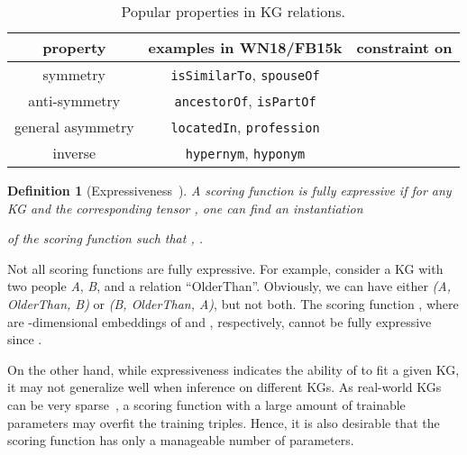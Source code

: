 \documentclass[10pt,journal,compsoc]{IEEEtran}
\newtheorem{definition}{Definition}
\begin{document}
\begin{table}[t]
	\centering
	\caption{Popular properties in KG relations.}
	\label{tab:relations}
	\setlength\tabcolsep{1.5pt}
	\renewcommand{\arraystretch}{1.08}
	\vspace{-10px}
	\begin{tabular}{c|c|c} \toprule
		property & examples in WN18/FB15k & constraint on \\ \midrule
		symmetry
		&  \texttt{isSimilarTo}, \texttt{spouseOf} 
		&     
		\\  anti-symmetry
		&  \texttt{ancestorOf}, \texttt{isPartOf} 
		&    
		\\general asymmetry
		& \texttt{locatedIn}, \texttt{profession} 
		&     
		\\  inverse 
		&  \texttt{hypernym}, \texttt{hyponym}  
		& 		
		\\ 
		\bottomrule
	\end{tabular} 
	\vspace{-12px}
\end{table}


\begin{definition}[Expressiveness~\cite{trouillon2017knowledge,wang2017multi,balavzevic2019tucker}] 
	\label{def:express}
	A scoring function 
   is {\em fully expressive\/} if
for any KG  and the corresponding tensor , one can find an instantiation 
	
of 
	the scoring function  such that
	, .
\end{definition}



Not all scoring functions are fully expressive.
For example, consider a KG with two people \textit{A}, \textit{B}, and 
a relation ``OlderThan''. Obviously, we can have
either \textit{(A, OlderThan, B)} or \textit{(B, OlderThan, A)}, but not both.
The scoring function , where
 are -dimensional embeddings of  and ,
respectively, cannot be fully expressive
since
.

On the other hand,
while expressiveness  indicates
the ability of  to fit a given KG,
it may not 
generalize well when inference on different KGs.
As real-world KGs can be very sparse~\cite{singhal2012introducing,wang2017knowledge},
a scoring function with a large amount of trainable parameters may overfit the training triples.
Hence, it is also desirable that the scoring function has only a manageable number of parameters.
\end{document}
